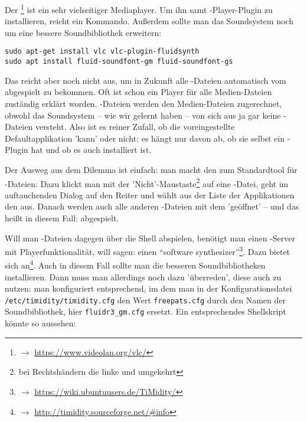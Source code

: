 Der \footnote{$\rightarrow$
\href{https://www.videolan.org/vlc/}{https://www.videolan.org/vlc/}} ist ein sehr
vielseitiger Mediaplayer. Um ihn samt -Player-Plugin zu installieren, 
reicht ein Kommando. Außerdem sollte man das Soundsystem noch um eine
bessere Soundbibliothek erweitern:

\begin{verbatim}
sudo apt-get install vlc vlc-plugin-fluidsynth
sudo apt install fluid-soundfont-gm fluid-soundfont-gs
\end{verbatim}

Das reicht aber noch nicht aus, um in Zukunft alle -Dateien
automatisch vom  abgespielt zu bekommen. Oft ist schon ein Player für
alle Medien-Dateien zuständig erklärt worden. -Dateien werden den
Medien-Dateien zugerechnet, obwohl das Soundsystem -- wie wir gelernt haben --
von sich aus ja gar keine -Dateien versteht. Also ist es reiner
Zufall, ob die voreingestellte Defaultapplikation  'kann' oder nicht:
es hängt nur davon ab, ob sie selbst ein -Plugin hat und ob es auch
installiert ist.

Der Ausweg aus dem Dilemma ist einfach: man macht den  zum Standardtool
für -Dateien: Dazu klickt man mit der 'Nicht'-Maustaste\footnote{bei
Rechtshändern die linke und umgekehrt} auf eine -Datei, geht im
auftauchenden Dialog auf den Reiter  und wählt aus der Liste der
Applikationen den   aus. Danach werden auch alle anderen
-Dateien mit dem   'geöffnet' -- und das heißt in diesem
Fall: abgespielt.

Will man -Dateien dagegen über die Shell abspielen, benötigt man einen
-Server mit Playerfunktionalität, will sagen: einen \enquote{software
synthesizer}\footnote{$\rightarrow$
\href{https://wiki.ubuntuusers.de/TiMidity/}{https://wiki.ubuntuusers.de/TiMidity/}}.
Dazu bietet sich  an\footnote{$\rightarrow$
\href{http://timidity.sourceforge.net/{\#}info}{http://timidity.sourceforge.net/{\#}info}}.
Auch in diesem Fall sollte man die besseren Soundbibliotheken installieren. Dann
muss man  allerdings noch dazu 'überreden', diese auch zu nutzen:
man konfiguriert  entsprechend, im dem man in der
Konfigurationsdatei \texttt{/etc/timidity/timidity.cfg} den Wert
\texttt{freepats.cfg} durch den Namen der Soundbibliothek, hier
\texttt{fluidr3\_gm.cfg} ersetzt. Ein entsprechendes Shellskript könnte so
aussehen:

